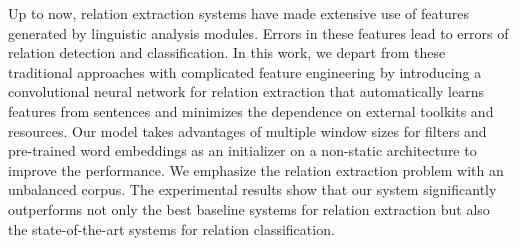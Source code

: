 Up to now, relation extraction systems have made extensive use of features generated by linguistic analysis modules. Errors in these features lead to errors of relation detection and classification. In this work, we depart from these traditional approaches with complicated feature engineering by introducing a convolutional neural network for relation extraction that automatically learns features from sentences and minimizes the dependence on external toolkits and resources. Our model takes advantages of multiple window sizes for filters and pre-trained word embeddings as an initializer on a non-static architecture to improve the performance. We emphasize the relation extraction problem with an unbalanced corpus. The experimental results show that our system significantly outperforms not only the best baseline systems for relation extraction but also the state-of-the-art systems for relation classification.

